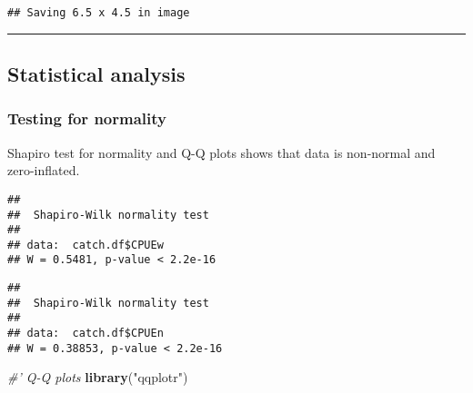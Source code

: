 \documentclass[]{article}
\newenvironment{Shaded}{\begin{snugshade}}{\end{snugshade}}
\newcommand{\KeywordTok}[1]{\textcolor[rgb]{0.13,0.29,0.53}{\textbf{#1}}}
\newcommand{\DecValTok}[1]{\textcolor[rgb]{0.00,0.00,0.81}{#1}}
\newcommand{\StringTok}[1]{\textcolor[rgb]{0.31,0.60,0.02}{#1}}
\newcommand{\CommentTok}[1]{\textcolor[rgb]{0.56,0.35,0.01}{\textit{#1}}}
\newcommand{\OperatorTok}[1]{\textcolor[rgb]{0.81,0.36,0.00}{\textbf{#1}}}
\newcommand{\NormalTok}[1]{#1}
\begin{document}
\begin{verbatim}
## Saving 6.5 x 4.5 in image
\end{verbatim}

\begin{center}\rule{0.5\linewidth}{\linethickness}\end{center}

\subsection{Statistical analysis}\label{statistical-analysis}

\subsubsection{Testing for normality}\label{testing-for-normality}

Shapiro test for normality and Q-Q plots shows that data is non-normal
and zero-inflated.

\begin{Shaded}
\end{Shaded}

\begin{verbatim}
## 
##  Shapiro-Wilk normality test
## 
## data:  catch.df$CPUEw
## W = 0.5481, p-value < 2.2e-16
\end{verbatim}

\begin{Shaded}
\end{Shaded}

\begin{verbatim}
## 
##  Shapiro-Wilk normality test
## 
## data:  catch.df$CPUEn
## W = 0.38853, p-value < 2.2e-16
\end{verbatim}

\begin{Shaded}
\begin{Highlighting}[]
\CommentTok{#' Q-Q plots}
\KeywordTok{library}\NormalTok{(}\StringTok{"qqplotr"}\NormalTok{)}
\end{Highlighting}
\end{Shaded}
\end{document}
